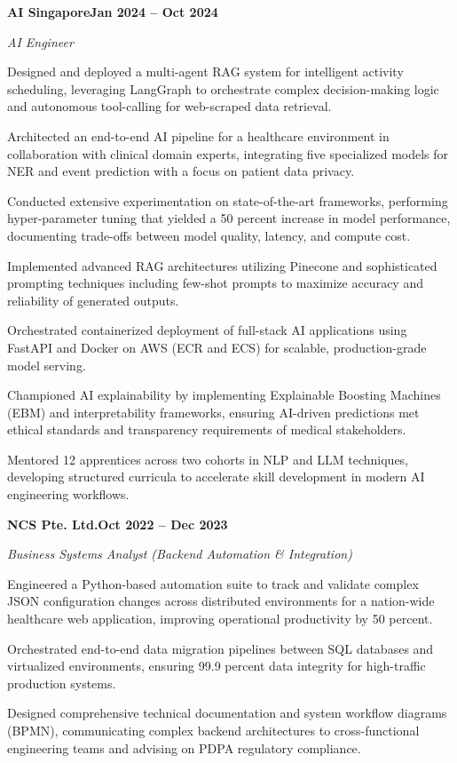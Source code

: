 \documentclass[letterpaper,10pt]{article}
\newcommand{\headingBf}[2]{\par\noindent\hspace*{10pt}\textbf{#1}\hfill\textbf{#2}}
\newcommand{\headingIt}[2]{\par\noindent\hspace*{10pt}\textit{#1}\hfill\textit{#2}}
\newenvironment{resume_list}{\vspace{-7pt}\begin{itemize}[itemsep=-2px, parsep=1pt, leftmargin=30pt]}{\end{itemize}}
\begin{document}
  \headingBf{AI Singapore}{Jan 2024 -- Oct 2024}
  \headingIt{AI Engineer}{}
  \begin{resume_list}
    \item Designed and deployed a multi-agent RAG system for intelligent activity scheduling, leveraging LangGraph to orchestrate complex decision-making logic and autonomous tool-calling for web-scraped data retrieval.
    \item Architected an end-to-end AI pipeline for a healthcare environment in collaboration with clinical domain experts, integrating five specialized models for NER and event prediction with a focus on patient data privacy.
    \item Conducted extensive experimentation on state-of-the-art frameworks, performing hyper-parameter tuning that yielded a 50 percent increase in model performance, documenting trade-offs between model quality, latency, and compute cost.
    \item Implemented advanced RAG architectures utilizing Pinecone and sophisticated prompting techniques including few-shot prompts to maximize accuracy and reliability of generated outputs.
    \item Orchestrated containerized deployment of full-stack AI applications using FastAPI and Docker on AWS (ECR and ECS) for scalable, production-grade model serving.
    \item Championed AI explainability by implementing Explainable Boosting Machines (EBM) and interpretability frameworks, ensuring AI-driven predictions met ethical standards and transparency requirements of medical stakeholders.
    \item Mentored 12 apprentices across two cohorts in NLP and LLM techniques, developing structured curricula to accelerate skill development in modern AI engineering workflows.
  \end{resume_list}

  \headingBf{NCS Pte. Ltd.}{Oct 2022 -- Dec 2023}
  \headingIt{Business Systems Analyst (Backend Automation \& Integration)}{}
  \begin{resume_list}
    \item Engineered a Python-based automation suite to track and validate complex JSON configuration changes across distributed environments for a nation-wide healthcare web application, improving operational productivity by 50 percent.
    \item Orchestrated end-to-end data migration pipelines between SQL databases and virtualized environments, ensuring 99.9 percent data integrity for high-traffic production systems.
    \item Designed comprehensive technical documentation and system workflow diagrams (BPMN), communicating complex backend architectures to cross-functional engineering teams and advising on PDPA regulatory compliance.
  \end{resume_list}
\end{document}
